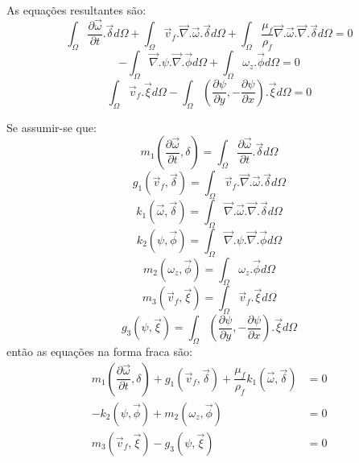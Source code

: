 As equações resultantes são:
\begin{equation}
    \int_{\Omega}
    \dfrac{\partial \vec{\omega}}{\partial t}
    .\vec{\delta} d\Omega +
    \int_{\Omega}
    \vec{v}_f.\vec{\nabla}.\vec{\omega}
    .\vec{\delta} d\Omega +
    \int_{\Omega}
    \dfrac{\mu_f}{\rho_f}
    \vec{\nabla}.\vec{\omega}.\vec{\nabla}
    .\vec{\delta} d\Omega= 0
\end{equation}
\begin{equation}
    -\int_{\Omega}
    \vec{\nabla}.\psi.\vec{\nabla}
    .\vec{\phi} d\Omega +
    \int_{\Omega}
    \omega_z
    .\vec{\phi} d\Omega = 0
\end{equation}
\begin{equation}
    \int_{\Omega}
    \vec{v}_f
    .\vec{\xi} d\Omega -
    \int_{\Omega}
    \left(\dfrac{\partial \psi}{\partial y},
    -\dfrac{\partial \psi}{\partial x} \right)
    .\vec{\xi} d\Omega = 0
\end{equation}

Se assumir-se que:
\begin{equation}
    m_1 \left(\dfrac{\partial \vec{\omega}}{\partial t}, \delta\right) =
    \int_{\Omega}
    \dfrac{\partial \vec{\omega}}{\partial t}
    .\vec{\delta} d\Omega
\end{equation}
\begin{equation}
    g_1 (\vec{v}_f, \vec{\delta}) =
    \int_{\Omega}
    \vec{v}_f.\vec{\nabla}.\vec{\omega}
    .\vec{\delta} d\Omega
\end{equation}
\begin{equation}
    k_1 (\vec{\omega}, \vec{\delta}) =
    \int_{\Omega}
    \vec{\nabla}.\vec{\omega}.\vec{\nabla}
    .\vec{\delta} d\Omega
\end{equation}
\begin{equation}
    k_2 (\psi, \vec{\phi}) =
    \int_{\Omega}
    \vec{\nabla}.\psi.\vec{\nabla}
    .\vec{\phi} d\Omega
\end{equation}
\begin{equation}
    m_2 (\omega_z, \vec{\phi}) =
    \int_{\Omega}
    \omega_z
    .\vec{\phi} d\Omega
\end{equation}
\begin{equation}
    m_3 (\vec{v}_f, \vec{\xi}) =
    \int_{\Omega}
    \vec{v}_f
    .\vec{\xi} d\Omega
\end{equation}
\begin{equation}
    g_3 (\psi, \vec{\xi}) =
    \int_{\Omega}
    \left(\dfrac{\partial \psi}{\partial y},
    -\dfrac{\partial \psi}{\partial x} \right)
    .\vec{\xi} d\Omega
\end{equation}
então as equações na forma fraca são:
\begin{align}
    m_1 \left(\dfrac{\partial \vec{\omega}}{\partial t}, \delta\right) +
    g_1 (\vec{v}_f, \vec{\delta}) + 
    \dfrac{\mu_f}{\rho_f} k_1 (\vec{\omega}, \vec{\delta}) &=0\\
    -k_2 (\psi, \vec{\phi}) +
    m_2 (\omega_z, \vec{\phi}) &= 0 \\
    m_3 (\vec{v}_f, \vec{\xi}) - 
    g_3 (\psi, \vec{\xi}) &=0
\end{align}

